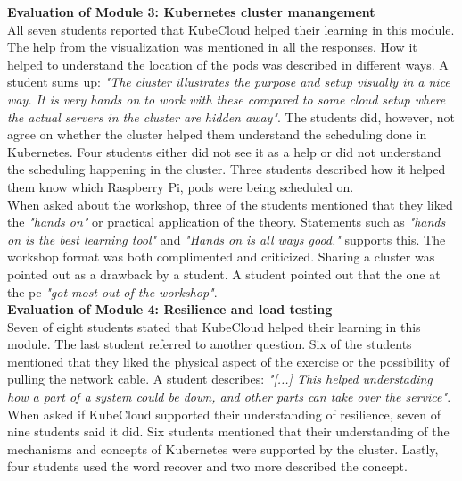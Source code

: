 \noindent
\textbf{Evaluation of Module 3: Kubernetes cluster manangement}\\
\noindent
All seven students reported that KubeCloud helped their learning in this module. The help from the visualization was mentioned in all the responses. How it helped to understand the location of the pods was described in different ways. A student sums up: \textit{"The cluster illustrates the purpose and setup visually in a nice way. It is very hands on to work with these compared to some cloud setup where the actual servers in the cluster are hidden away"}.
\noindent
The students did, however, not agree on whether the cluster helped them understand the scheduling done in Kubernetes. Four students either did not see it as a help or did not understand the scheduling happening in the cluster. Three students described how it helped them know which Raspberry Pi, pods were being scheduled on. \\
\noindent
When asked about the workshop, three of the students mentioned that they liked the \textit{"hands on"} or practical application of the theory. Statements such as \textit{"hands on is the best learning tool"} and \textit{"Hands on is all ways good."} supports this. The workshop format was both complimented and criticized. Sharing a cluster was pointed out as a drawback by a student. A student pointed out that the one at the pc \textit{"got most out of the workshop"}. \\

\noindent
\textbf{Evaluation of Module 4: Resilience and load testing} \\
\noindent
Seven of eight students stated that KubeCloud helped their learning in this module. The last student referred to another question.
Six of the students mentioned that they liked the physical aspect of the exercise or the possibility of pulling the network cable. A student describes: \textit{"[...] This helped understading how a part of a system could be down, and other parts can take over the service"}.
\noindent
When asked if KubeCloud supported their understanding of resilience, seven of nine students said it did. Six students mentioned that their understanding of the mechanisms and concepts of Kubernetes were supported by the cluster. Lastly, four students used the word recover and two more described the concept. \\

